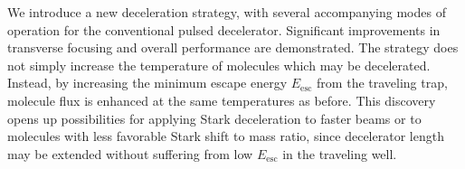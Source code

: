 \documentclass[%
 reprint,
 amsmath,amssymb,
 aps,
prl,
]{revtex4-1}
\begin{document}



We introduce a new deceleration strategy, with several accompanying modes of operation for the conventional pulsed decelerator. 
Significant improvements in transverse focusing and overall performance are demonstrated.
The strategy does not simply increase the temperature of molecules which may be decelerated.
Instead, by increasing the minimum escape energy $E_\text{esc}$ from the traveling trap, molecule flux is enhanced at the same temperatures as before.
This discovery opens up possibilities for applying Stark deceleration to faster beams or to molecules with less favorable Stark shift to mass ratio, since decelerator length may be extended without suffering from low $E_\text{esc}$ in the traveling well.
\end{document}
